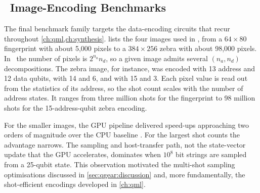 \subsection{\qcrank\ Image-Encoding Benchmarks}\label{sec:qgear:results-qcrank}

The final benchmark family targets the data-encoding circuits that recur throughout \cref{ch:qml,ch:synthesis}.  lists the four images used in \cite{guo2025qgear}, from a $64\times 80$ fingerprint with about 5,000 pixels to a $384\times 256$ zebra with about 98,000 pixels. In \qcrank\ the number of pixels is $2^{n_{a}}n_{d}$, so a given image admits several $(n_{a},n_{d})$ decompositions. The zebra image, for instance, was encoded with 13 address and 12 data qubits, with 14 and 6, and with 15 and 3. Each pixel value is read out from the statistics of its address, so the shot count scales with the number of address states. It ranges from three million shots for the fingerprint to 98 million shots for the 15-address-qubit zebra encoding.

For the smaller images, the GPU pipeline delivered speed-ups approaching two orders of magnitude over the CPU baseline \cite{guo2025qgear}. For the largest shot counts the advantage narrows. The sampling and host-transfer path, not the state-vector update that the GPU accelerates, dominates when $10^{8}$ bit strings are sampled from a 25-qubit state. This observation motivated the multi-shot sampling optimisations discussed in \cref{sec:qgear:discussion} and, more fundamentally, the shot-efficient encodings developed in \cref{ch:qml}.

